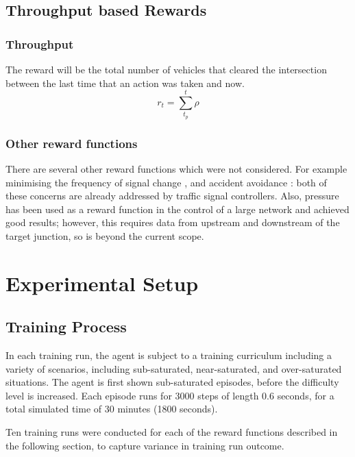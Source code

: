 \documentclass[conference]{IEEEtran}
\begin{document}
\subsection{Throughput based Rewards}
\subsubsection{Throughput}
The reward will be the total number of vehicles that cleared the intersection between the last time that an action was taken and now.
\begin{equation}
    r_t = \sum_{t_p}^t \rho
\label{eq:throughput}
\end{equation}

\subsubsection{Other reward functions}
There are several other reward functions which were not considered. For example minimising the frequency of signal change \cite{vanderpol2016} \cite{wei2018}, and accident avoidance \cite{vanderpol2016}: both of these concerns are already addressed by traffic signal controllers. Also, pressure has been used as a reward function in the control of a large network \cite{yau} \cite{wei2019} \cite{varaiya2013} \cite{wei2018} \cite{wei2019a} \cite{chen2020} and achieved good results; however, this requires data from upstream and downstream of the target junction, so is beyond the current scope.

\section{Experimental Setup}\label{exp_setup}
\subsection{Training Process}

In each training run, the agent is subject to a training curriculum including a variety of scenarios, including sub-saturated, near-saturated, and over-saturated situations. The agent is first shown sub-saturated episodes, before the difficulty level is increased. Each episode runs for 3000 steps of length 0.6 seconds, for a total simulated time of 30 minutes (1800 seconds).

Ten training runs were conducted for each of the reward functions described in the following section, to capture variance in training run outcome.
\end{document}
